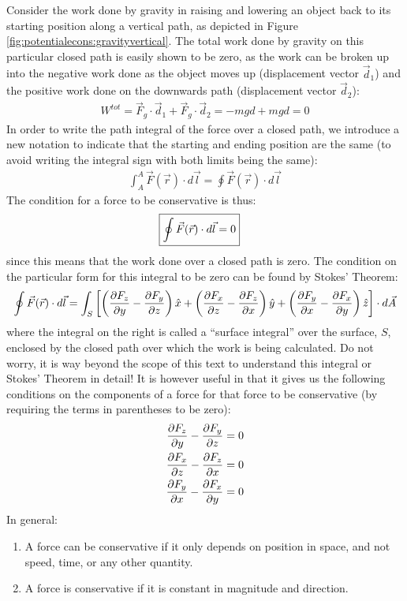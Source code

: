 Consider the work done by gravity in raising and lowering an object back to its starting position along a vertical path, as depicted in Figure \ref{fig:potentialecons:gravityvertical}.
The total work done by gravity on this particular closed path is easily shown to be zero, as the work can be broken up into the negative work done as the object moves up (displacement vector $\vec d_1$) and the positive work done on the downwards path (displacement vector $\vec d_2$):
\begin{align*}
W^{tot} = \vec F_g \cdot \vec d_1 + \vec F_g \cdot \vec d_2 = -mgd + mgd = 0 
\end{align*}
In order to write the path integral of the force over a closed path, we introduce a new notation to indicate that the starting and ending position are the same (to avoid writing the integral sign with both limits being the same):
\begin{align*}
\int_A^A \vec F(\vec r) \cdot d\vec l = \oint \vec F(\vec r) \cdot d\vec l
\end{align*}
The condition for a force to be conservative is thus:
\begin{align}
\Aboxed{\oint \vec F(\vec r) \cdot d\vec l = 0}
\end{align}
since this means that the work done over a closed path is zero. The condition on the particular form for this integral to be zero can be found by Stokes' Theorem:
\begin{align*}
\oint \vec F(\vec r) \cdot d\vec l = \int_S \left[\left(\frac{\partial F_z}{\partial y}-\frac{\partial F_y}{\partial z}\right)\hat x+ \left(\frac{\partial F_x}{\partial z}-\frac{\partial F_z}{\partial x}\right)\hat y + \left(\frac{\partial F_y}{\partial x}-\frac{\partial F_x}{\partial y}\right)\hat z \right]\cdot d\vec A
\end{align*}
where the integral on the right is called a ``surface integral'' over the surface, $S$, enclosed by the closed path over which the work is being calculated. Do not worry, it is way beyond the scope of this text to understand this integral or Stokes' Theorem in detail! It is however useful in that it gives us the following conditions on the components of a force for that force to be conservative (by requiring the terms in parentheses to be zero):
\begin{align}
\label{eq:potentialecons:conservative}
\frac{\partial F_z}{\partial y}-\frac{\partial F_y}{\partial z} &= 0 \nonumber\\
\frac{\partial F_x}{\partial z}-\frac{\partial F_z}{\partial x} &= 0\nonumber\\
\frac{\partial F_y}{\partial x}-\frac{\partial F_x}{\partial y} &= 0
\end{align}
In general:
\begin{enumerate}
\item A force can be conservative if it only depends on position in space, and not speed, time, or any other quantity.
\item A force is conservative if it is constant in magnitude and direction.
\end{enumerate}

